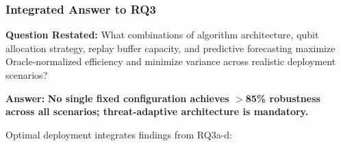 
\subsubsection{Integrated Answer to RQ3}

\noindent\textbf{Question Restated:} What combinations of algorithm architecture, qubit allocation strategy, replay buffer capacity, and predictive forecasting maximize Oracle-normalized efficiency and minimize variance across realistic deployment scenarios?

\noindent\textbf{Answer:} \textbf{No single fixed configuration achieves $>$85\% robustness across all scenarios; threat-adaptive architecture is mandatory.}

\noindent Optimal deployment integrates findings from RQ3a-d:

